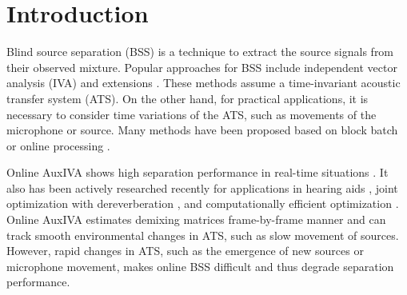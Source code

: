 \documentclass[sip,biber]{now-journal}
\begin{document}
\section{Introduction}\label{sec:intro}
%
%
Blind source separation (BSS) \cite{Makino:2018:ASS} is a technique to extract the source signals from their observed mixture.
Popular approaches for BSS include independent vector analysis (IVA) \cite{Kim:2006:ASLP,Hiroe:2006:ICA} and extensions \cite{Kitamura:2016:ASLP,Nugraha:2020:SPL,Brendel:2020:SP}.
These methods assume a time-invariant acoustic transfer system (ATS).
On the other hand, for practical applications, it is necessary to consider time variations of the ATS, such as movements of the microphone or source.
Many methods have been proposed based on block batch \cite{Koldovsky:2019:ICASSP,Koldovsky:2021:SP,Jansky:2022:ASMP} or online processing \cite{Kim:2010:CASI,Taniguchi:2014:HSCMA}.

Online AuxIVA shows high separation performance in real-time situations \cite{Taniguchi:2014:HSCMA}.
It also has been actively researched recently for applications in hearing aids \cite{Sunohara:2017:ICASSP}, joint optimization with dereverberation \cite{Ueda:2021:ICASSP}, and computationally efficient optimization \cite{Nakashima:2023:ICASSP}.
Online AuxIVA estimates demixing matrices frame-by-frame manner and can track smooth environmental changes in ATS, such as slow movement of sources.
However, rapid changes in ATS, such as the emergence of new sources or microphone movement, makes online BSS difficult and thus degrade separation performance.
\end{document}
